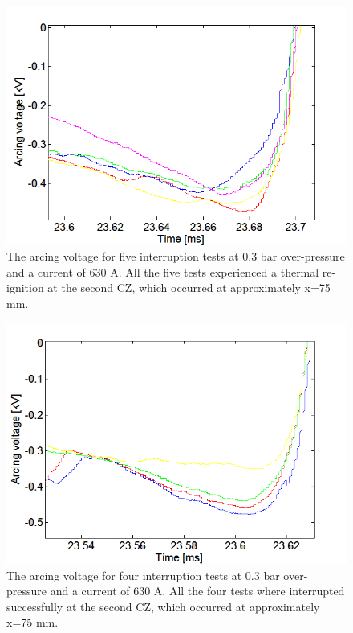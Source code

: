 \documentclass[10pt,b5paper,twoside]{article}
\begin{document}
\begin{figure}[H]
\centering
\includegraphics[scale=0.6, angle =0 ]{Bilder/Results/ArcingVoltage_75_reIgnition.png}
\caption{The arcing voltage for five interruption tests at 0.3 bar over-pressure and a current of 630 A. All the five tests experienced a thermal re-ignition at the second CZ, which occurred at approximately  x=75 mm.} \label{fig:75mmUnSuccessful}
\end{figure}

\begin{figure}[H]
\centering
\includegraphics[scale=0.6, angle =0 ]{Bilder/Results/ArcingVoltage_75_none_reIgnition.png}
\caption{The arcing voltage for four interruption tests at 0.3 bar over-pressure and a current of 630 A. All the four tests where interrupted successfully at the second CZ, which occurred at approximately  x=75 mm.} \label{fig:75mmSuccessful}
\end{figure}
\end{document}
